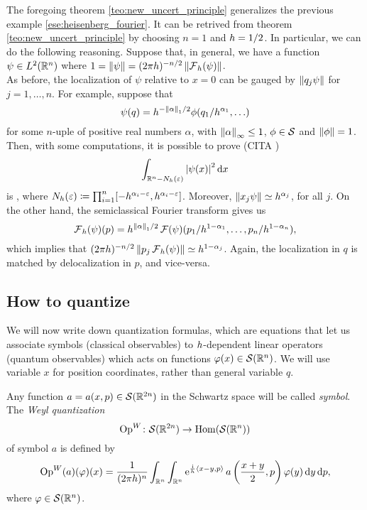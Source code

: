 The foregoing theorem \ref{teo:new_uncert_principle} generalizes the previous example \ref{ese:heisenberg_fourier}. It can be retrived from theorem \ref{teo:new_uncert_principle} by choosing $n=1$ and $h=1/2$. In particular, we can do the following reasoning. Suppose that, in general, we have a function $\psi\in L^{2}(\mathbb{R}^{n})$ where $1=\left\lVert \psi\right\rVert=(2\pi h)^{-n/2}\left\lVert \operatorname{\mathcal{F}}_{h}(\psi)\right\rVert$.\\
As before, the localization of $\psi$ relative to $x=0$ can be gauged by $\left\lVert q_{j}\psi\right\rVert$ for $j=1,\ldots,n$. For example, suppose that
\[
\psi(q)=h^{-\left\lVert \alpha\right\rVert_{1}/2}\phi(q_{1}/h^{\alpha_{1}},\ldots)
\]
for some $n$-uple of positive real numbers $\alpha$, with $\left\lVert \alpha\right\rVert_{\infty}\leq 1$, $\phi\in\mathcal{S}$ and $\left\lVert \phi\right\rVert=1$. Then, with some computations, it is possible to prove  (CITA \cite{Zworski:semic})
\[
\int_{\mathbb{R}^{n}-N_{h}(\varepsilon)}\left| \psi(x)\right|^{2}\mathop{}\!\mathrm{d} x
\]
is , where $N_{h}(\varepsilon)\coloneqq\prod_{i=1}^{n}[-h^{\alpha_{i}-\varepsilon},h^{\alpha_{i}-\varepsilon}]$. Moreover, $\left\lVert x_{j}\psi\right\rVert\simeq h^{\alpha_{j}}$, for all $j$. On the other hand, the semiclassical Fourier transform gives us 
\[
\operatorname{\mathcal{F}}_{h}(\psi)(p)=h^{\left\lVert \alpha\right\rVert_{1}/2}\operatorname{\mathcal{F}}(\psi)(p_{1}/h^{1-\alpha_{1}},\ldots,p_{n}/h^{1-\alpha_{n}}),
\]
which implies that $(2\pi h)^{-n/2}\left\lVert p_{j}\operatorname{\mathcal{F}}_{h}(\psi)\right\rVert\simeq h^{1-\alpha_{j}}$. Again, the localization in $q$ is matched by delocalization in $p$, and vice-versa.


\subsection{How to quantize}

\label{subsec:how_to_quant}

We will now write down quantization formulas, which are equations that let us associate symbols (classical observables) to $h$-dependent linear operators (quantum observables) which acts on functions $\varphi(x)\in\mathcal{S}(\mathbb{R}^{n})$. We will use variable $x$ for position coordinates, rather than general variable $q$.

\begin{defin}
Any function $a=a(x,p)\in\mathcal{S}(\mathbb{R}^{2n})$ in the Schwartz space will be called \emph{symbol}. The \emph{Weyl quantization}
\[
\operatorname{Op}^{W}\colon\mathcal{S}(\mathbb{R}^{2n})\to\operatorname{Hom}(\mathcal{S}(\mathbb{R}^{n}))
\]
of symbol $a$ is defined by
\begin{equation}
\label{eq:weyl_quant_symbol}
\operatorname{Op}^{W}(a)(\varphi)(x)=\frac{1}{(2\pi h)^{n}}\int_{\mathbb{R}^{n}}\int_{\mathbb{R}^{n}}\mathrm{e}^{\frac{\mathrm{i}}{h}\left< x-y,p\right>}\, a\left(\frac{x+y}{2},p\right)\varphi(y)\mathop{}\!\mathrm{d} y\mathop{}\!\mathrm{d} p,
\end{equation}
where $\varphi\in\mathcal{S}(\mathbb{R}^{n})$.
\end{defin}


